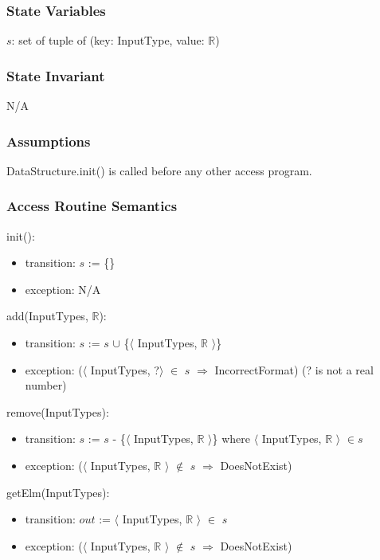 \documentclass[12pt, titlepage]{article}
\begin{document}
\subsubsection{State Variables}

$s$: set of tuple of (key: InputType, value: $\mathbb{R}$)

\subsubsection{State Invariant}
N/A

\subsubsection{Assumptions}

DataStructure.init() is called before any other access program.

\subsubsection{Access Routine Semantics}

\noindent init():
\begin{itemize}
	\item transition: $s$ := \{\}
	\item exception: N/A
\end{itemize}

\noindent add(InputTypes, $\mathbb{R}$):
\begin{itemize}
	\item transition: $s$ := $s$ $\cup$ \{$\langle$ InputTypes, $\mathbb{R}$ $\rangle$\}
	\item exception: ($\langle$ InputTypes, ?$\rangle$ $\in$ $s$ $\Rightarrow$ IncorrectFormat) (? is not a real number)
\end{itemize}

\noindent remove(InputTypes):
\begin{itemize}
	\item transition: $s$ := $s$ - \{$\langle$ InputTypes, $\mathbb{R}$ $\rangle$\} where $\langle$ InputTypes, $\mathbb{R}$ $\rangle$ $\in $$s$
	\item exception: ($\langle$ InputTypes, $\mathbb{R}$ $\rangle$ $\notin$ $s$ $\Rightarrow$ DoesNotExist)
\end{itemize}

\noindent getElm(InputTypes):
\begin{itemize}
	\item transition: $out$ := $\langle$ InputTypes, $\mathbb{R}$ $\rangle$ $\in$ $s$
	\item exception: ($\langle$ InputTypes, $\mathbb{R}$ $\rangle$ $\notin$ $s$ $\Rightarrow$ DoesNotExist)
\end{itemize}
\end{document}
